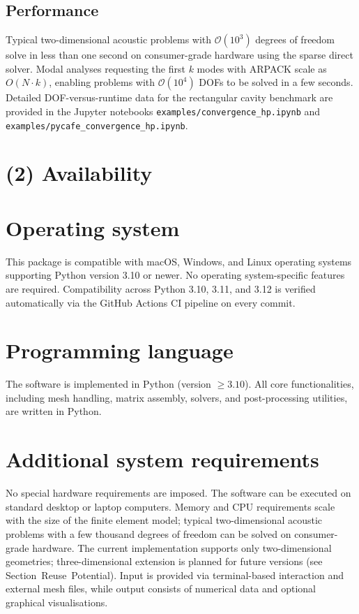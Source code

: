 \documentclass{jors}
\begin{document}
\subsection*{Performance}

Typical two-dimensional acoustic problems with $\mathcal{O}(10^3)$ degrees of freedom solve in less than one second on consumer-grade hardware using the sparse direct solver. Modal analyses requesting the first $k$ modes with ARPACK scale as $O(N \cdot k)$, enabling problems with $\mathcal{O}(10^4)$ DOFs to be solved in a few seconds. Detailed DOF-versus-runtime data for the rectangular cavity benchmark are provided in the Jupyter notebooks \texttt{examples/convergence\_hp.ipynb} and \texttt{examples/pycafe\_convergence\_hp.ipynb}.


\section*{(2) Availability}
\vspace{0.5cm}
\section*{Operating system}

This package is compatible with macOS, Windows, and Linux operating systems supporting Python version 3.10 or newer. No operating system-specific features are required. Compatibility across Python 3.10, 3.11, and 3.12 is verified automatically via the GitHub Actions CI pipeline on every commit.

\section*{Programming language}
The software is implemented in Python (version $\geq 3.10$). All core functionalities, including mesh handling, matrix assembly, solvers, and post-processing utilities, are written in Python.

\section*{Additional system requirements}
No special hardware requirements are imposed. The software can be executed on standard desktop or laptop computers. Memory and CPU requirements scale with the size of the finite element model; typical two-dimensional acoustic problems with a few thousand degrees of freedom can be solved on consumer-grade hardware. The current implementation supports only two-dimensional geometries; three-dimensional extension is planned for future versions (see Section~Reuse~Potential). Input is provided via terminal-based interaction and external mesh files, while output consists of numerical data and optional graphical visualisations.
\end{document}
